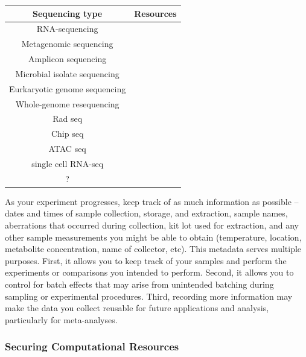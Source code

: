 \documentclass[10pt,letterpaper]{article}
\begin{document}
\begin{tabular}{|c|c|}
\hline
\textbf{Sequencing type} & \textbf{Resources} \\
\hline
RNA-sequencing & \cite{conesa2016, schurch2016, ching2014} \\
\hline
Metagenomic sequencing & \cite{knight2012, quince2017, eisenhofer2019} \\
\hline
Amplicon sequencing & \cite{mclaren2019, murray2015, sinha2017 } \\
\hline
Microbial isolate sequencing & \cite{liao2015} \\
\hline
Eurkaryotic genome sequencing & \\
\hline
Whole-genome resequencing & \cite{fuentes2017} \\
\hline
Rad seq & \\
\hline
Chip seq & \\
\hline
ATAC seq & \\
\hline
single cell RNA-seq & \cite{bacher2016, haque2017} \\
\hline
? & \\
\hline
\end{tabular} 

As your experiment progresses, keep track of as much information as possible -- dates and times of sample collection, storage, and extraction, sample names, aberrations that occurred during collection, kit lot used for extraction, and any other sample measurements you might be able to obtain (temperature, location, metabolite concentration, name of collector, etc). 
This metadata serves multiple purposes. 
First, it allows you to keep track of your samples and perform the experiments or comparisons you intended to perform. 
Second, it allows you to control for batch effects that may arise from unintended batching during sampling or experimental procedures. 
Third, recording more information may make the data you collect reusable for future applications and analysis, particularly for meta-analyses. 

\subsubsection*{Securing Computational Resources}
\end{document}
